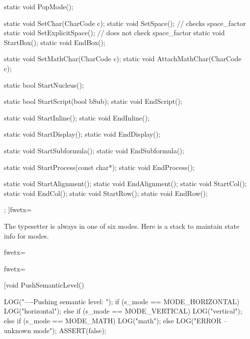 {{{{{{{{{{{{   static void PopMode();

   static void SetChar(CharCode c);
   static void SetSpace(); // checks space_factor
   static void SetExplicitSpace(); // does not check space_factor
   static void StartBox();
   static void EndBox();

   static void SetMathChar(CharCode c);
   static void AttachMathChar(CharCode c);

   static bool StartNucleus();

   static bool StartScript(bool bSub);
   static void EndScript();

   static void StartInline();
   static void EndInline();

   static void StartDisplay();
   static void EndDisplay();

   static void StartSubformula();
   static void EndSubformula();

   static void StartProcess(const char*);
   static void EndProcess();

   static void StartAlignment();
   static void EndAlignment();
   static void StartCol();
   static void EndCol();
   static void StartRow();
   static void EndRow();
};
]fwetx=%
\fwcdef 
\fwbeginmacronotes
{}
\fwendmacronotes
\fwendmacro



The typesetter is always in one of six modes. Here is a stack to maintain
state info for modes.

\fwbeginmacro
{}\fwplusequals \fwodef {}fwetx=%
\fwcdef 
\fwbeginmacronotes
{}
\fwendmacronotes
\fwendmacro


\fwbeginmacro
{}\fwplusequals \fwodef {}fwetx=%
\fwcdef 
\fwbeginmacronotes
{}
\fwendmacronotes
\fwendmacro


\fwbeginmacro
{}\fwplusequals \fwodef \fwbtx[void PushSemanticLevel()
{
   LOG("\n----Pushing semantic level: ");
   if (s_mode == MODE_HORIZONTAL){
      LOG("horizontal");
   } else if (s_mode == MODE_VERTICAL){
      LOG("vertical");
   } else if (s_mode == MODE_MATH){
      LOG("math");
   } else {
      LOG("ERROR -- unknown mode");
      ASSERT(false);
   }

}}}}}}}}}}}}
